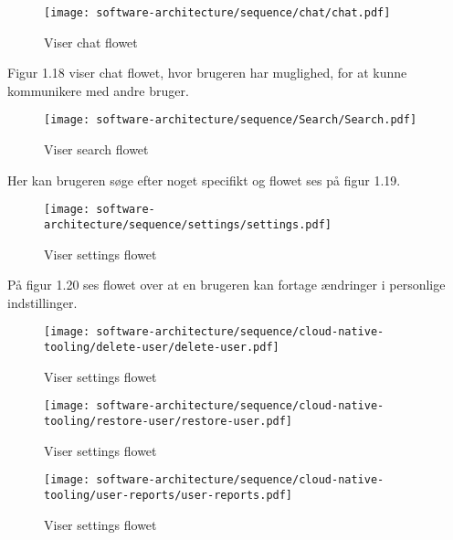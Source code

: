 \begin{figure}[ht]
    \centering
\texttt{[image: software-architecture/sequence/chat/chat.pdf]}
\caption{Viser chat flowet}
\label{fig:figure4}
\end{figure}
Figur 1.18 viser chat flowet, hvor brugeren har muglighed, for at kunne kommunikere med andre bruger.
\newpage
\begin{figure}[ht]
    \centering
\texttt{[image: software-architecture/sequence/Search/Search.pdf]}
\caption{Viser search flowet}
\label{fig:figure4}
\end{figure}
Her kan brugeren søge efter noget specifikt og flowet ses på figur 1.19.

\begin{figure}[ht]
    \centering
\texttt{[image: software-architecture/sequence/settings/settings.pdf]}
\caption{Viser settings flowet}
\label{fig:figure4}
\end{figure}
På figur 1.20 ses flowet over at en brugeren kan fortage ændringer i personlige indstillinger. 

\begin{figure}[ht]
    \centering
\texttt{[image: software-architecture/sequence/cloud-native-tooling/delete-user/delete-user.pdf]}
\caption{Viser settings flowet}
\label{fig:figure4}
\end{figure}

\begin{figure}[ht]
    \centering
\texttt{[image: software-architecture/sequence/cloud-native-tooling/restore-user/restore-user.pdf]}
\caption{Viser settings flowet}
\label{fig:figure4}
\end{figure}

\begin{figure}[ht]
    \centering
\texttt{[image: software-architecture/sequence/cloud-native-tooling/user-reports/user-reports.pdf]}
\caption{Viser settings flowet}
\label{fig:figure4}
\end{figure}